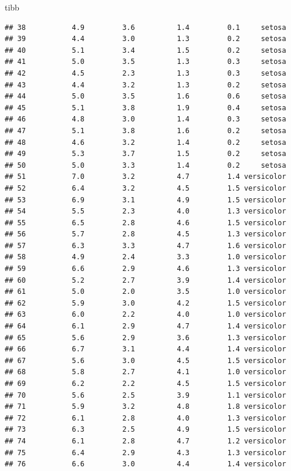 \documentclass[ignorenonframetext,]{beamer}
\begin{document}
\begin{frame}[fragile]{tibb}
\begin{verbatim}
## 38           4.9         3.6          1.4         0.1     setosa
## 39           4.4         3.0          1.3         0.2     setosa
## 40           5.1         3.4          1.5         0.2     setosa
## 41           5.0         3.5          1.3         0.3     setosa
## 42           4.5         2.3          1.3         0.3     setosa
## 43           4.4         3.2          1.3         0.2     setosa
## 44           5.0         3.5          1.6         0.6     setosa
## 45           5.1         3.8          1.9         0.4     setosa
## 46           4.8         3.0          1.4         0.3     setosa
## 47           5.1         3.8          1.6         0.2     setosa
## 48           4.6         3.2          1.4         0.2     setosa
## 49           5.3         3.7          1.5         0.2     setosa
## 50           5.0         3.3          1.4         0.2     setosa
## 51           7.0         3.2          4.7         1.4 versicolor
## 52           6.4         3.2          4.5         1.5 versicolor
## 53           6.9         3.1          4.9         1.5 versicolor
## 54           5.5         2.3          4.0         1.3 versicolor
## 55           6.5         2.8          4.6         1.5 versicolor
## 56           5.7         2.8          4.5         1.3 versicolor
## 57           6.3         3.3          4.7         1.6 versicolor
## 58           4.9         2.4          3.3         1.0 versicolor
## 59           6.6         2.9          4.6         1.3 versicolor
## 60           5.2         2.7          3.9         1.4 versicolor
## 61           5.0         2.0          3.5         1.0 versicolor
## 62           5.9         3.0          4.2         1.5 versicolor
## 63           6.0         2.2          4.0         1.0 versicolor
## 64           6.1         2.9          4.7         1.4 versicolor
## 65           5.6         2.9          3.6         1.3 versicolor
## 66           6.7         3.1          4.4         1.4 versicolor
## 67           5.6         3.0          4.5         1.5 versicolor
## 68           5.8         2.7          4.1         1.0 versicolor
## 69           6.2         2.2          4.5         1.5 versicolor
## 70           5.6         2.5          3.9         1.1 versicolor
## 71           5.9         3.2          4.8         1.8 versicolor
## 72           6.1         2.8          4.0         1.3 versicolor
## 73           6.3         2.5          4.9         1.5 versicolor
## 74           6.1         2.8          4.7         1.2 versicolor
## 75           6.4         2.9          4.3         1.3 versicolor
## 76           6.6         3.0          4.4         1.4 versicolor

\end{verbatim}
\end{frame}
\end{document}
